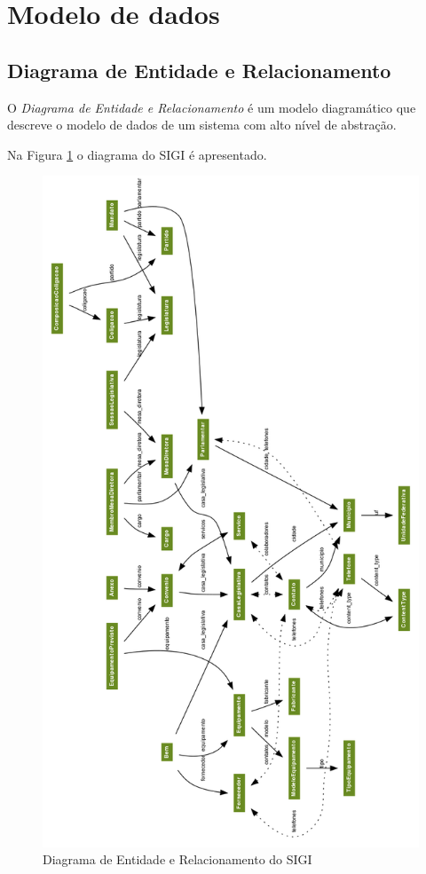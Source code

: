 %
%

\section{Modelo de dados}
\label{sec:modelo}

\subsection{Diagrama de Entidade e Relacionamento}
O \emph{Diagrama de Entidade e Relacionamento} é um modelo
diagramático que descreve o modelo de dados de um sistema com alto
nível de abstração.

Na Figura \ref{fig:er} o diagrama do SIGI é apresentado.

\begin{figure}[p]
  \centering
  \includegraphics[width=120mm]{../imagens/er.png}
  \caption{Diagrama de Entidade e Relacionamento do SIGI}
  \label{fig:er}
\end{figure}

